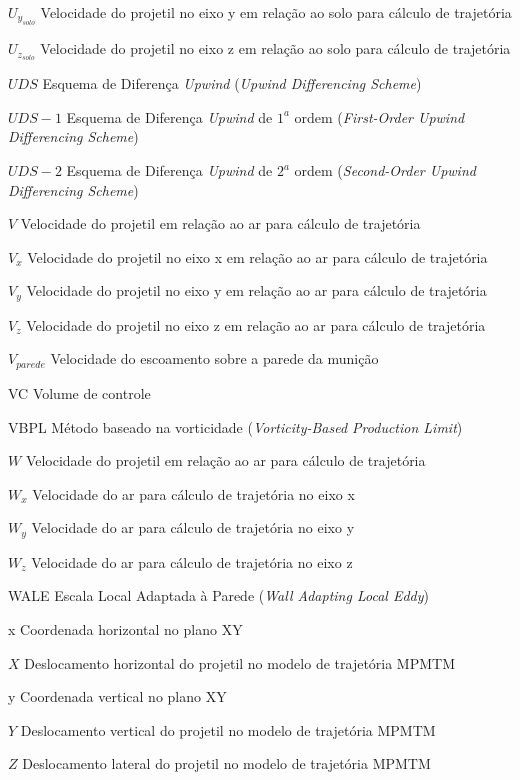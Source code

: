 \begin{siglas}
    \item[\(U_{y_{solo}}\)] Velocidade do projetil no eixo y em relação ao solo para cálculo de trajetória
    \item[\(U_{z_{solo}}\)] Velocidade do projetil no eixo z em relação ao solo para cálculo de trajetória
    \item[\(UDS\)] Esquema de Diferença \textit{Upwind} (\textit{Upwind Differencing Scheme})
    \item[\(UDS-1\)] Esquema de Diferença \textit{Upwind} de $1^a$ ordem (\textit{First-Order Upwind Differencing Scheme})
    \item[\(UDS-2\)] Esquema de Diferença \textit{Upwind} de $2^a$ ordem (\textit{Second-Order Upwind Differencing Scheme})
    \item[\(V\)] Velocidade do projetil em relação ao ar para cálculo de trajetória
    \item[\(V_x\)] Velocidade do projetil no eixo x em relação ao ar para cálculo de trajetória
    \item[\(V_y\)] Velocidade do projetil no eixo y em relação ao ar para cálculo de trajetória
    \item[\(V_z\)] Velocidade do projetil no eixo z em relação ao ar para cálculo de trajetória
    \item[\(V_{parede}\)] Velocidade do escoamento sobre a parede da munição
    \item[VC] Volume de controle
    \item[VBPL] Método baseado na vorticidade (\textit{Vorticity-Based Production Limit})
    \item[\(W\)] Velocidade do projetil em relação ao ar para cálculo de trajetória
    \item[\(W_x\)] Velocidade do ar para cálculo de trajetória no eixo x
    \item[\(W_y\)] Velocidade do ar para cálculo de trajetória no eixo y
    \item[\(W_z\)] Velocidade do ar para cálculo de trajetória no eixo z
    \item[WALE] Escala Local Adaptada à Parede (\textit{Wall Adapting Local Eddy})
    \item[x] Coordenada horizontal no plano XY
    \item[\(X\)] Deslocamento horizontal do projetil no modelo de trajetória MPMTM
    \item[y] Coordenada vertical no plano XY
    \item[\(Y\)] Deslocamento vertical do projetil no modelo de trajetória MPMTM
    \item[\(Z\)] Deslocamento lateral do projetil no modelo de trajetória MPMTM
\end{siglas}

